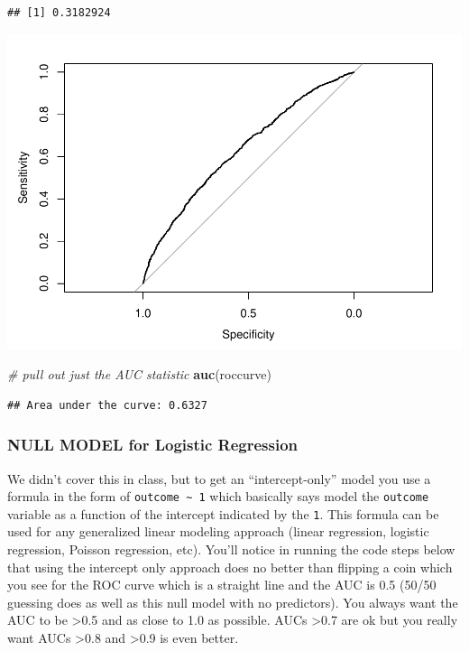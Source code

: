 \documentclass[]{article}
\newenvironment{Shaded}{\begin{snugshade}}{\end{snugshade}}
\newcommand{\KeywordTok}[1]{\textcolor[rgb]{0.13,0.29,0.53}{\textbf{{#1}}}}
\newcommand{\StringTok}[1]{\textcolor[rgb]{0.31,0.60,0.02}{{#1}}}
\newcommand{\CommentTok}[1]{\textcolor[rgb]{0.56,0.35,0.01}{\textit{{#1}}}}
\newcommand{\NormalTok}[1]{{#1}}
\begin{document}
\begin{verbatim}
## [1] 0.3182924
\end{verbatim}

\begin{Shaded}
\end{Shaded}

\includegraphics{Hmwk7AnswerKey_files/figure-latex/unnamed-chunk-17-2.pdf}

\begin{Shaded}
\begin{Highlighting}[]
\CommentTok{# pull out just the AUC statistic}
\KeywordTok{auc}\NormalTok{(roccurve)}
\end{Highlighting}
\end{Shaded}

\begin{verbatim}
## Area under the curve: 0.6327
\end{verbatim}

\subsubsection{NULL MODEL for Logistic
Regression}\label{null-model-for-logistic-regression-1}

We didn't cover this in class, but to get an ``intercept-only'' model
you use a formula in the form of \texttt{outcome\ \textasciitilde{}\ 1}
which basically says model the \texttt{outcome} variable as a function
of the intercept indicated by the \texttt{1}. This formula can be used
for any generalized linear modeling approach (linear regression,
logistic regression, Poisson regression, etc). You'll notice in running
the code steps below that using the intercept only approach does no
better than flipping a coin which you see for the ROC curve which is a
straight line and the AUC is 0.5 (50/50 guessing does as well as this
null model with no predictors). You always want the AUC to be
\textgreater{}0.5 and as close to 1.0 as possible. AUCs
\textgreater{}0.7 are ok but you really want AUCs \textgreater{}0.8 and
\textgreater{}0.9 is even better.
\end{document}
